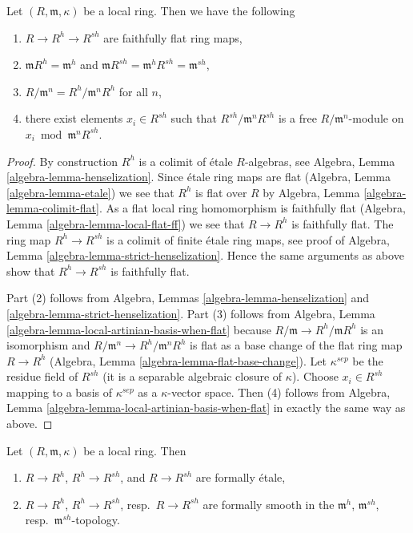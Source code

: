 \begin{lemma}
\label{lemma-dumb-properties-henselization}
Let $(R, \mathfrak m, \kappa)$ be a local ring. Then we have the following
\begin{enumerate}
\item $R \to R^h \to R^{sh}$ are faithfully flat ring maps,
\item $\mathfrak m R^h = \mathfrak m^h$ and
$\mathfrak m R^{sh} = \mathfrak m^h R^{sh} = \mathfrak m^{sh}$,
\item $R/\mathfrak m^n = R^h/\mathfrak m^nR^h$ for all $n$,
\item there exist elements $x_i \in R^{sh}$ such that
$R^{sh}/\mathfrak m^nR^{sh}$ is a free $R/\mathfrak m^n$-module
on $x_i \bmod \mathfrak m^nR^{sh}$.
\end{enumerate}
\end{lemma}

\begin{proof}
By construction $R^h$ is a colimit of \'etale $R$-algebras, see
Algebra, Lemma \ref{algebra-lemma-henselization}. Since \'etale
ring maps are flat (Algebra, Lemma \ref{algebra-lemma-etale}) we see that
$R^h$ is flat over $R$ by
Algebra, Lemma \ref{algebra-lemma-colimit-flat}.
As a flat local ring homomorphism is faithfully flat
(Algebra, Lemma \ref{algebra-lemma-local-flat-ff})
we see that $R \to R^h$ is faithfully flat.
The ring map $R^h \to R^{sh}$ is a colimit of finite \'etale ring
maps, see proof of Algebra, Lemma \ref{algebra-lemma-strict-henselization}.
Hence the same arguments as above show that $R^h \to R^{sh}$ is
faithfully flat.

\medskip\noindent
Part (2) follows from Algebra, Lemmas \ref{algebra-lemma-henselization} and
\ref{algebra-lemma-strict-henselization}. Part (3) follows from
Algebra, Lemma \ref{algebra-lemma-local-artinian-basis-when-flat}
because $R/\mathfrak m \to R^h/\mathfrak mR^h$ is an isomorphism and
$R/\mathfrak m^n \to R^h/\mathfrak m^nR^h$ is flat as a base change of
the flat ring map $R \to R^h$
(Algebra, Lemma \ref{algebra-lemma-flat-base-change}).
Let $\kappa^{sep}$ be the residue field of $R^{sh}$ (it is a
separable algebraic closure of $\kappa$). Choose $x_i \in R^{sh}$
mapping to a basis of $\kappa^{sep}$ as a $\kappa$-vector space.
Then (4) follows from
Algebra, Lemma \ref{algebra-lemma-local-artinian-basis-when-flat}
in exactly the same way as above.
\end{proof}

\begin{lemma}
\label{lemma-henselization-formally-smooth}
Let $(R, \mathfrak m, \kappa)$ be a local ring. Then
\begin{enumerate}
\item $R \to R^h$, $R^h \to R^{sh}$, and $R \to R^{sh}$ are formally \'etale,
\item $R \to R^h$, $R^h \to R^{sh}$, resp.\ $R \to R^{sh}$ are formally
smooth in the $\mathfrak m^h$, $\mathfrak m^{sh}$,
resp.\ $\mathfrak m^{sh}$-topology.
\end{enumerate}
\end{lemma}

